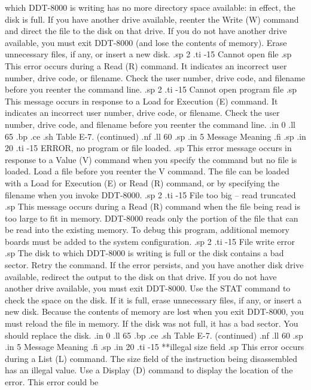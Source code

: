 which DDT-8000 is writing has no more directory space available: in effect, 
the disk is full.  If you have another drive available, reenter the Write 
(W) command and direct the file to the disk 
on that drive.  If you do not have another drive available, you 
must exit DDT-8000 (and lose the contents of memory).  Erase unnecessary 
files, if any, or insert a new disk.    
.sp 2
.ti -15
Cannot open file
.sp
This error occurs during a Read (R) command.  It indicates an 
incorrect user number, drive code, or filename.  Check the user number, drive 
code, and filename before you reenter the command line.
.sp 2
.ti -15
Cannot open program file
.sp
This message occurs in response to a Load for Execution (E) 
command.  It indicates 
an incorrect user number, drive code, or filename.  Check the user number, 
drive code, and filename before 
you reenter the command line.
.in 0
.ll 65
.bp
.ce
.sh
Table E-7.  (continued)
.nf
.ll 60
.sp
.in 5
Message        Meaning
.fi
.sp
.in 20
.ti -15
ERROR, no program or file loaded.
.sp
This error message occurs in response to a Value (V) 
command when you specify the command but no file is loaded.  Load a file 
before you reenter the V command.  The file can
be loaded with a Load for Execution (E) or Read (R) command, or by 
specifying  the filename when you invoke DDT-8000.
.sp 2
.ti -15
File too big -- read truncated
.sp
This message occurs during a Read (R) command when the 
file being read is too large to fit in memory.  DDT-8000 reads only 
the portion of the file
that can be read into the existing memory.  To debug this program, additional 
memory boards must be added to the system configuration.  
.sp 2 
.ti -15
File write error
.sp  
The disk to which DDT-8000 is writing is full or the 
disk contains a bad sector.  Retry the command.  If the error persists, and 
you have another
disk drive available, redirect the output to the disk on that 
drive.  If you 
do not have another drive available, you must exit DDT-8000.  
Use the STAT command to check the space on the disk.  If it is full, 
erase unnecessary files, if any, or insert a new disk.  Because the contents 
of memory 
are lost when you exit DDT-8000, you must reload the file 
in memory.  If the disk was not full, it has a bad sector.  You
should replace the disk.
.in 0
.ll 65
.bp
.ce
.sh
Table E-7.  (continued)
.nf
.ll 60
.sp
.in 5
Message        Meaning
.fi
.sp
.in 20
.ti -15
**illegal size field
.sp
This error occurs during a List (L) command.  The size field of the 
instruction being disassembled has an illegal value.  Use a Display (D) 
command to display the location of the error.  This error could be 
